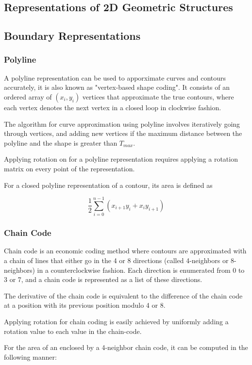 \documentclass{article}
\begin{document}
\begin{multicols}{2}
\section{Representations of 2D Geometric Structures}
\subsection{Boundary Representations}
\subsubsection{Polyline}

A polyline representation can be used to apporximate curves and contours accurately, it is also known as "vertex-based shape coding". It consists of an ordered array of $(x_i, y_i)$ vertices that approximate the true contours, where each vertex denotes the next vertex in a closed loop in clockwise fashion.

The algorithm for curve approximation using polyline involves iteratively going through vertices, and adding new vertices if the maximum distance between the polyline and the shape is greater than $T_{max}$.

Applying rotation on for a polyline representation requires applying a rotation matrix on every point of the representation.

For a closed polyline representation of a contour, its area is defined as

$$
\frac{1}{2}\sum_{i=0}^{n-1}(x_{i+1}y_i + x_iy_{i+1})
$$

\subsubsection{Chain Code}

Chain code is an economic coding method where contours are approximated with a chain of lines that either go in the 4 or 8 directions (called 4-neighbors or 8-neighbors) in a counterclockwise fashion. Each direction is enumerated from 0 to 3 or 7, and a chain code is represented as a list of these directions.

The derivative of the chain code is equivalent to the difference of the chain code at a position with its previous position modulo 4 or 8.

Applying rotation for chain coding is easily achieved by uniformly adding a rotation value to each value in the chain-code.

For the area of an enclosed by a 4-neighbor chain code, it can be computed in the following manner:


\end{multicols}
\end{document}

